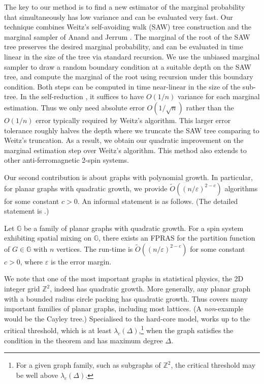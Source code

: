 \documentclass{theoretics}
\def\=#1{\mathbb{#1}}
\newcommand{\eps}{\varepsilon}
\begin{document}
The key to our method is to find a new estimator of the marginal probability that simultaneously has low variance and can be evaluated very fast.
Our technique combines Weitz's self-avoiding walk (SAW) tree construction and the marginal sampler of Anand and Jerrum \cite{AJ22}.
The marginal of the root of the SAW tree preserves the desired marginal probability,
and can be evaluated in time linear in the size of the tree via standard recursion.
We use the unbiased marginal sampler to draw a random boundary condition at a suitable depth on the SAW tree, and compute the marginal of the root using recursion under this boundary condition.
Both steps can be computed in time near-linear in the size of the sub-tree.
In the self-reduction \cite{JVV86}, it suffices to have $O(1/n)$ variance for each marginal estimation.
Thus we only need absolute error $O(1/\sqrt{n})$ rather than the $O(1/n)$ error typically required by Weitz's algorithm.
This larger error tolerance roughly halves the depth where we truncate the SAW tree comparing to Weitz's truncation. %
As a result, we obtain our quadratic improvement on the marginal estimation step over Weitz's algorithm.
This method also extends to other anti-ferromagnetic 2-spin systems.

Our second contribution is about graphs with polynomial growth.
In particular, for planar graphs with quadratic growth,
we provide $\widetilde{O}((n/\eps)^{2-c})$ algorithms for some constant $c>0$.
An informal statement is as follows.
(The detailed statement is .)

\begin{theorem}\label{thm:main2}
  Let $\=G$ be a family of planar graphs with quadratic growth.
  For a spin system exhibiting spatial mixing on $\=G$,
  there exists an FPRAS for the partition function of $G\in\=G$ with $n$ vertices.
  The run-time is $\widetilde{O}((n/\eps)^{2-c})$ for some constant $c>0$,
  where $\eps$ is the error margin.
\end{theorem}

We note that one of the most important graphs in statistical physics, the 2D integer grid $\=Z^2$, indeed has quadratic growth.
More generally, any planar graph with a bounded radius circle packing has quadratic growth.
Thus  covers many important families of planar graphs, including most lattices.
(A \emph{non}-example would be the Cayley tree.)
Specialised to the hard-core model, 
 works up to the critical threshold, which is at least $\lambda_c(\Delta)$,\footnote{For a given graph family, such as subgraphs of $\mathbb{Z}^2$, the critical threshold may be well above $\lambda_c(\Delta)$.}
when the graph satisfies the condition in the theorem and has maximum degree $\Delta$.
\end{document}
